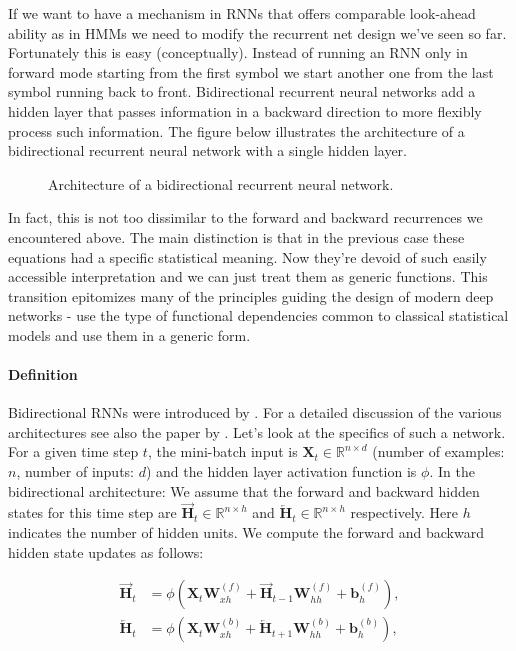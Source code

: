 If we want to have a mechanism in RNNs that offers comparable look-ahead ability as in HMMs we need to modify the recurrent net design we’ve seen so far. Fortunately this is easy (conceptually). Instead of running an RNN only in forward mode starting from the first symbol we start another one from the last symbol running back to front. Bidirectional recurrent neural networks add a hidden layer that passes information in a backward direction to more flexibly process such information. The figure below illustrates the architecture of a bidirectional recurrent neural network with a single hidden layer.

\begin{figure}[hpt]
	\centering
	
	\caption{Architecture of a bidirectional recurrent neural network.}
	\label{fig:birnn}
\end{figure}

In fact, this is not too dissimilar to the forward and backward recurrences we encountered above. The main distinction is that in the previous case these equations had a specific statistical meaning. Now they’re devoid of such easily accessible interpretation and we can just treat them as generic functions. This transition epitomizes many of the principles guiding the design of modern deep networks - use the type of functional dependencies common to classical statistical models and use them in a generic form.

\paragraph{Definition}

Bidirectional RNNs were introduced by \citet{Schuster1997}. For a detailed discussion of the various architectures see also the paper by \citet{Graves2005}. Let's look at the specifics of such a network. For a given time step $t$, the mini-batch input is $\mathbf{X}_t \in \mathbb{R}^{n \times d}$ (number of examples: $n$, number of inputs: $d$) and the hidden layer activation function is $\phi$. In the bidirectional architecture:
We assume that the forward and backward hidden states for this time step are $\overrightarrow{\mathbf{H}}_t  \in \mathbb{R}^{n \times h}$ and $\overleftarrow{\mathbf{H}}_t  \in \mathbb{R}^{n \times h}$ respectively. Here $h$ indicates the number of hidden units. We compute the forward and backward hidden state updates as follows:

$$
\begin{aligned}
\overrightarrow{\mathbf{H}}_t &= \phi(\mathbf{X}_t \mathbf{W}_{xh}^{(f)} + \overrightarrow{\mathbf{H}}_{t-1} \mathbf{W}_{hh}^{(f)}  + \mathbf{b}_h^{(f)}),\\
\overleftarrow{\mathbf{H}}_t &= \phi(\mathbf{X}_t \mathbf{W}_{xh}^{(b)} + \overleftarrow{\mathbf{H}}_{t+1} \mathbf{W}_{hh}^{(b)}  + \mathbf{b}_h^{(b)}),
\end{aligned}
$$

